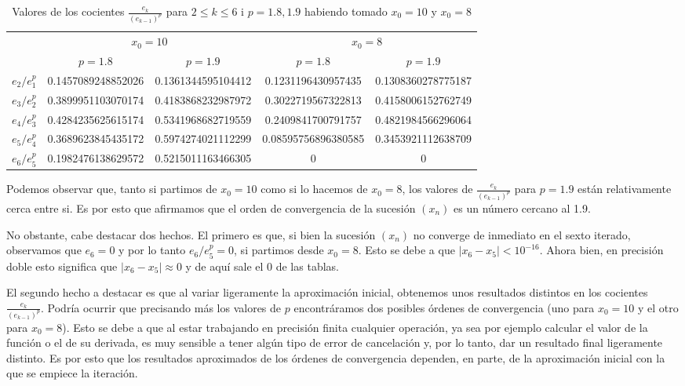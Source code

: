 \documentclass[a4paper]{article}
\begin{document}
\begin{table}[ht]
    \centering
    \begin{tabular}{|c|c|c||c|c|}
        \hline
        & \multicolumn{2}{c||}{$x_0=10$} & \multicolumn{2}{c|}{$x_0=8$}\\
        \cline{2-5}
        & $p=1.8$ & $p=1.9$ & $p=1.8$ & $p=1.9$\\
        \hline
        $e_2/e_1^p$ & 0.1457089248852026 & 0.1361344595104412 & 0.1231196430957435 & 0.1308360278775187\\
        \hline
        $e_3/e_2^p$ & 0.3899951103070174 & 0.4183868232987972 & 0.3022719567322813 & 0.4158006152762749\\	
        \hline
        $e_4/e_3^p$ & 0.4284235625615174 & 0.5341968682719559 & 0.2409841700791757 & 0.4821984566296064\\	
        \hline
        $e_5/e_4^p$ & 0.3689623845435172 & 0.5974274021112299 & 0.08595756896380585 & 0.3453921112638709\\	
        \hline
        $e_6/e_5^p$ & 0.1982476138629572 & 0.5215011163466305 & 0 & 0\\
        \hline
    \end{tabular}
    \caption{Valores de los cocientes $\frac{e_k}{(e_{k-1})^p}$ para $2\leq k\leq 6$ i $p=1.8,1.9$ habiendo tomado $x_0=10$ y $x_0=8$}
    \label{pro2-tab3}
\end{table}
Podemos observar que, tanto si partimos de $x_0=10$ como si lo hacemos de $x_0=8$, los valores de $\frac{e_k}{(e_{k-1})^p}$ para $p=1.9$ están relativamente cerca entre si. Es por esto que afirmamos que el orden de convergencia de la sucesión $(x_n)$ es un número cercano al 1.9.\par
No obstante, cabe destacar dos hechos. El primero es que, si bien la sucesión $(x_n)$ no converge de inmediato en el sexto iterado, observamos que $e_6=0$ y por lo tanto $e_6/e_5^p=0$, si partimos desde $x_0=8$. Esto se debe a que $|x_6-x_5|<10^{-16}$. Ahora bien, en precisión doble esto significa que $|x_6-x_5|\approx0$ y de aquí sale el 0 de las tablas.\par El segundo hecho a destacar es que al variar ligeramente la aproximación inicial, obtenemos unos resultados distintos en los cocientes $\frac{e_k}{(e_{k-1})^p}$. Podría ocurrir que precisando más los valores de $p$ encontráramos dos posibles órdenes de convergencia (uno para $x_0=10$ y el otro para $x_0=8$). Esto se debe a que al estar trabajando en precisión finita cualquier operación, ya sea por ejemplo calcular el valor de la función o el de su derivada, es muy sensible a tener algún tipo de error de cancelación y, por lo tanto, dar un resultado final ligeramente distinto. Es por esto que los resultados aproximados de los órdenes de convergencia dependen, en parte, de la aproximación inicial con la que se empiece la iteración.
\newpage
\end{document}
